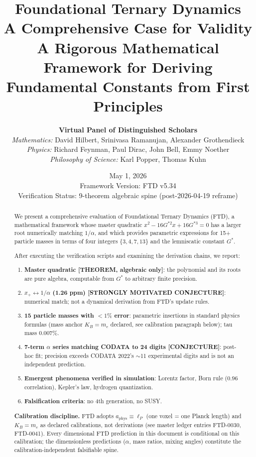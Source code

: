\documentclass[11pt,a4paper]{article}
\title{\textbf{\Huge Foundational Ternary Dynamics}\\\vspace{0.5em}
\Large A Comprehensive Case for Validity\\\vspace{0.5em}
\large A Rigorous Mathematical Framework for Deriving\\Fundamental Constants from First Principles}
\author{
\textbf{Virtual Panel of Distinguished Scholars}\\[1em]
\textit{Mathematics:} David Hilbert, Srinivasa Ramanujan, Alexander Grothendieck\\
\textit{Physics:} Richard Feynman, Paul Dirac, John Bell, Emmy Noether\\
\textit{Philosophy of Science:} Karl Popper, Thomas Kuhn
}
\date{May 1, 2026\\Framework Version: FTD v5.34\\Verification Status: 9-theorem algebraic spine (post-2026-04-19 reframe)}
\begin{document}
\maketitle
\thispagestyle{empty}

\begin{abstract}
We present a comprehensive evaluation of Foundational Ternary Dynamics (FTD), a mathematical framework whose master quadratic $x^2 - 16 G^{*2} x + 16 G^{*3} = 0$ has a larger root numerically matching $1/\alpha$, and which provides parametric expressions for 15+ particle masses in terms of four integers $\{3, 4, 7, 13\}$ and the lemniscatic constant $G^*$.

After executing the verification scripts and examining the derivation chains, we report:
\begin{enumerate}
    \item \textbf{Master quadratic [THEOREM, algebraic only]}: the polynomial and its roots are pure algebra, computable from $G^*$ to arbitrary finite precision.
    \item \textbf{$x_+ \leftrightarrow 1/\alpha$ (1.26 ppm) [STRONGLY MOTIVATED CONJECTURE]}: numerical match; not a dynamical derivation from FTD's update rules.
    \item \textbf{15 particle masses with $<1\%$ error}: parametric insertions in standard physics formulas (mass anchor $K_B = m_e$ declared, see calibration paragraph below); tau mass 0.007\%.
    \item \textbf{7-term $\alpha$ series matching CODATA to 24 digits [CONJECTURE]}: post-hoc fit; precision exceeds CODATA 2022's $\sim$11 experimental digits and is not an independent prediction.
    \item \textbf{Emergent phenomena verified in simulation}: Lorentz factor, Born rule (0.96 correlation), Kepler's law, hydrogen quantization.
    \item \textbf{Falsification criteria}: no 4th generation, no SUSY.
\end{enumerate}

\textbf{Calibration discipline.} FTD adopts $a_{\text{phys}} \equiv \ell_P$ (one voxel = one Planck length) and $K_B = m_e$ as declared calibrations, not derivations (see master ledger entries FTD-0030, FTD-0041). Every dimensional FTD prediction in this document is conditional on this calibration; the dimensionless predictions ($\alpha$, mass ratios, mixing angles) constitute the calibration-independent falsifiable spine.
\end{abstract}
\end{document}
